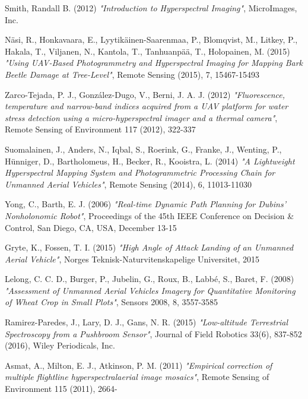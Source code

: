 \begin{thebibliography}{25}
	
	Smith, Randall B. (2012)
	\emph{"Introduction to Hyperspectral Imaging"},
	MicroImages, Inc.
	
	Näsi, R., Honkavaara, E., Lyytikäinen-Saarenmaa, P., Blomqvist, M., Litkey, P., Hakala, T., Viljanen, N., Kantola, T., Tanhuanpää, T., Holopainen, M. (2015)
	\emph{"Using UAV-Based Photogrammetry and Hyperspectral Imaging for Mapping Bark Beetle Damage at Tree-Level"},
	Remote Sensing (2015), 7, 15467-15493
	
	Zarco-Tejada, P. J., González-Dugo, V., Berni, J. A. J. (2012)
	\emph{"Fluorescence, temperature and narrow-band indices acquired from a UAV platform for water stress detection using a micro-hyperspectral imager and a thermal camera"},
	Remote Sensing of Environment 117 (2012), 322-337
	
	Suomalainen, J., Anders, N., Iqbal, S., Roerink, G., Franke, J., Wenting, P., Hünniger, D., Bartholomeus, H., Becker, R., Kooistra, L. (2014)
	\emph{"A Lightweight Hyperspectral Mapping System and Photogrammetric Processing Chain for Unmanned Aerial Vehicles"},
	Remote Sensing (2014), 6, 11013-11030
	
	
	Yong, C., Barth, E. J. (2006)
	\emph{"Real-time Dynamic Path Planning for Dubins' Nonholonomic Robot"},
	Proceedings of the 45th IEEE Conference on Decision \& Control, San Diego, CA, USA, December 13-15
	
	
	Gryte, K., Fossen, T. I. (2015)
	\emph{"High Angle of Attack Landing of an Unmanned Aerial Vehicle"},
	Norges Teknisk-Naturvitenskapelige Universitet, 2015
	
	
	Lelong, C. C. D., Burger, P., Jubelin, G., Roux, B., Labbé, S., Baret, F. (2008)
	\emph{"Assessment of Unmanned Aerial Vehicles Imagery for Quantitative Monitoring of Wheat Crop in Small Plots"},
	Sensors 2008, 8, 3557-3585
	
	Ramirez-Paredes, J., Lary, D. J., Gans, N. R. (2015)
	\emph{"Low-altitude Terrestrial Spectroscopy from a Pushbroom Sensor"},
	Journal of Field Robotics 33(6), 837-852 (2016), Wiley Periodicals, Inc.
	
	Asmat, A., Milton, E. J., Atkinson, P. M. (2011)
	\emph{"Empirical correction of multiple flightline hyperspectralaerial image mosaics"},
	Remote Sensing of Environment 115 (2011), 2664-
	

\end{thebibliography}
